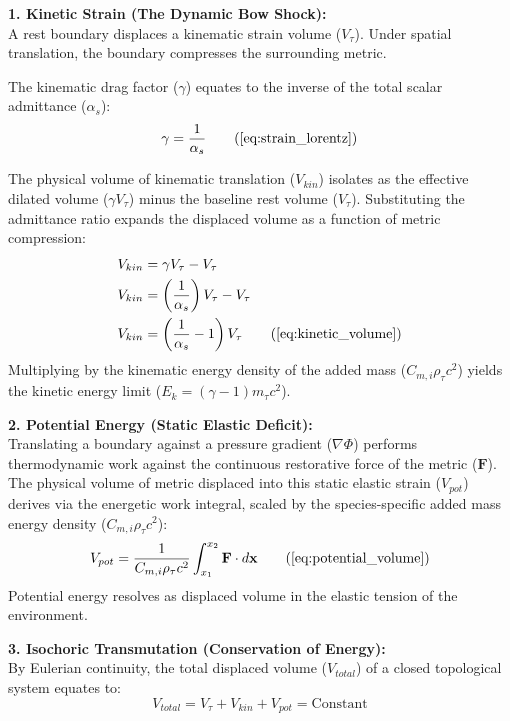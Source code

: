 \textbf{1. Kinetic Strain (The Dynamic Bow Shock):} \\
A rest boundary displaces a kinematic strain volume ($V_\tau$). Under spatial translation, the boundary compresses the surrounding metric. 

The kinematic drag factor ($\gamma$) equates to the inverse of the total scalar admittance ($\alpha_s$):
\begin{equation}
    \gamma = \frac{1}{\alpha_s} \tag{\ref{eq:strain_lorentz}}
\end{equation}

The physical volume of kinematic translation ($V_{kin}$) isolates as the effective dilated volume ($\gamma V_\tau$) minus the baseline rest volume ($V_\tau$). Substituting the admittance ratio expands the displaced volume as a function of metric compression:
\begin{align}
    V_{kin} &= \gamma V_\tau - V_\tau \nonumber \\
    V_{kin} &= \left(\frac{1}{\alpha_s}\right) V_\tau - V_\tau \nonumber \\
    V_{kin} &= \left(\frac{1}{\alpha_s} - 1\right) V_\tau \tag{\ref{eq:kinetic_volume}}
\end{align}
Multiplying by the kinematic energy density of the added mass ($C_{m,i}\rho_{\tau} c^2$) yields the kinetic energy limit ($E_k = (\gamma - 1)m_\tau c^2$). 

\textbf{2. Potential Energy (Static Elastic Deficit):} \\
Translating a boundary against a pressure gradient ($\nabla \Phi$) performs thermodynamic work against the continuous restorative force of the metric ($\mathbf{F}$). The physical volume of metric displaced into this static elastic strain ($V_{pot}$) derives via the energetic work integral, scaled by the species-specific added mass energy density ($C_{m,i}\rho_{\tau} c^2$): 
\begin{equation}
    V_{pot} = \frac{1}{C_{m,i}\rho_{\tau} c^2} \int_{x_1}^{x_2} \mathbf{F} \cdot d\mathbf{x} \tag{\ref{eq:potential_volume}}
\end{equation}
Potential energy resolves as displaced volume in the elastic tension of the environment.

\textbf{3. Isochoric Transmutation (Conservation of Energy):} \\
By Eulerian continuity, the total displaced volume ($V_{total}$) of a closed topological system equates to:
\begin{equation}
    V_{total} = V_\tau + V_{kin} + V_{pot} = \text{Constant} \nonumber
\end{equation}

